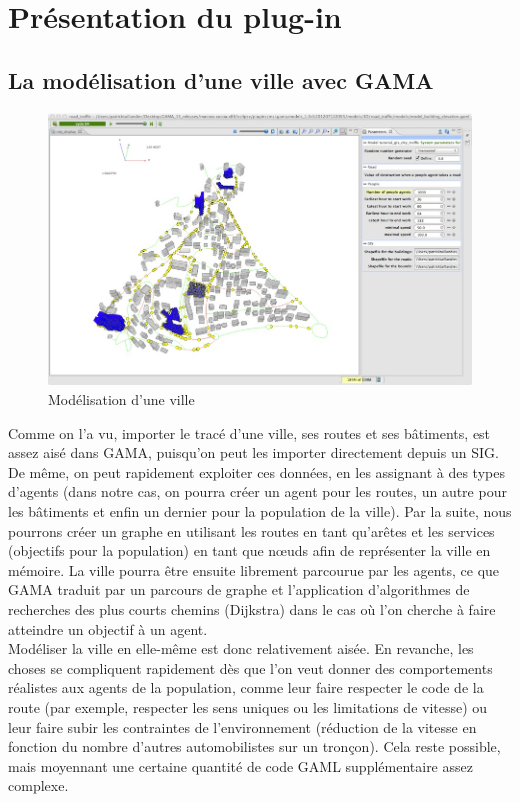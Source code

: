 \documentclass[11pt]{report} %
\begin{document}
\chapter{Pr\'esentation du plug-in}

\section{La mod\'elisation d'une ville avec GAMA}
\begin{figure}[!ht]%
\begin{center}
\includegraphics[width=\textwidth]{images/screenshot2.jpg}%
\end{center}
\caption{Mod\'elisation d'une ville}%
\end{figure}%
Comme on l'a vu, importer le trac\'e d'une ville, ses routes et ses bâtiments, est assez ais\'e dans GAMA, puisqu'on peut les importer directement depuis un SIG. De m\^eme, on peut rapidement exploiter ces donn\'ees, en les assignant \`a des types d'agents (dans notre cas, on pourra cr\'eer un agent pour les routes, un autre pour les bâtiments et enfin un dernier pour la population de la ville). Par la suite, nous pourrons cr\'eer un graphe en utilisant les routes en tant qu'ar\^etes et les \og services \fg{} (objectifs pour la population) en tant que n\oe{}uds afin de repr\'esenter la ville en m\'emoire. La ville pourra \^etre ensuite librement parcourue par les agents, ce que GAMA traduit par un parcours de graphe et l'application d'algorithmes de recherches des plus courts chemins (Dijkstra) dans le cas o\`u l'on cherche \`a faire atteindre un objectif \`a un agent.\\
Mod\'eliser la ville en elle-m\^eme est donc relativement ais\'ee. En revanche, les choses se compliquent rapidement d\`es que l'on veut donner des comportements r\'ealistes aux agents de la population, comme leur faire respecter le code de la route (par exemple, respecter les sens uniques ou les limitations de vitesse) ou leur faire subir les contraintes de l'environnement (r\'eduction de la vitesse en fonction du nombre d'autres automobilistes sur un tronçon). Cela reste possible, mais moyennant une certaine quantit\'e de code GAML suppl\'ementaire assez complexe.\\
\end{document}
